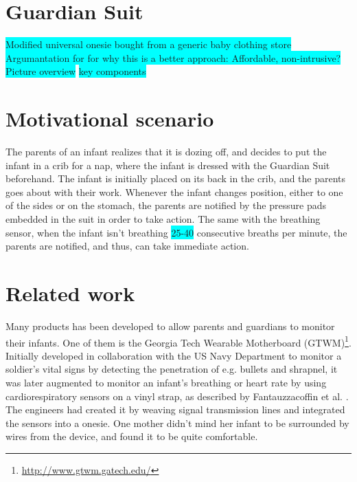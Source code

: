 \documentclass{sigchi-ext}
\begin{document}

\section{Guardian Suit}
\colorbox{cyan}{Modified universal onesie bought from a generic baby clothing store}
\colorbox{cyan}{Argumantation for for why this is a
better approach: Affordable, non-intrusive?}
\colorbox{cyan}{Picture overview}
\colorbox{cyan}{key components}

\section{Motivational scenario}
The parents of an infant realizes that it is dozing off, and decides to put the infant in a crib for a nap, where the infant is dressed with the Guardian Suit beforehand. The infant is initially placed on its back in the crib, and the parents goes about with their work. Whenever the infant changes position, either to one of the sides or on the stomach, the parents are notified by the pressure pads embedded in the suit in order to take action. The same with the breathing sensor, when the infant isn't breathing \colorbox{cyan}{25-40} consecutive breaths per minute, the parents are notified, and thus, can take immediate action.

\section{Related work}
Many products has been developed to allow parents and guardians to monitor their infants. One of them is the Georgia Tech Wearable Motherboard (GTWM)\footnote{\url{http://www.gtwm.gatech.edu/}}. Initially developed in collaboration with the US Navy Department to monitor a soldier's vital signs by detecting the penetration of e.g. bullets and shrapnel, it was later augmented to monitor an infant's breathing or heart rate by using cardiorespiratory sensors on a vinyl strap, as described by Fantauzzacoffin et al. \cite{p285-fantauzzacoffin}. The engineers had created it by weaving signal transmission lines and integrated the sensors into a onesie. One mother didn't mind her infant to be surrounded by wires from the device, and found it to be quite comfortable.
\end{document}
